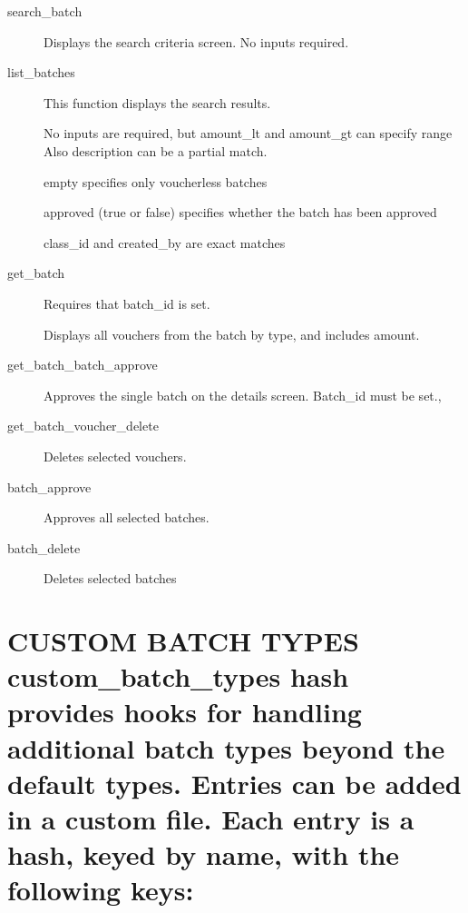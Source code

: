 \begin{description}
\begin{description}
\item[{search\_batch}] \mbox{}

Displays the search criteria screen.  No inputs required.


\item[{list\_batches}] \mbox{}

This function displays the search results.



No inputs are required, but amount\_lt and amount\_gt can specify range
Also description can be a partial match.



empty specifies only voucherless batches



approved (true or false) specifies whether the batch has been approved



class\_id and created\_by are exact matches


\item[{get\_batch}] \mbox{}

Requires that batch\_id is set.



Displays all vouchers from the batch by type, and includes amount.


\item[{get\_batch\_batch\_approve}] \mbox{}

Approves the single batch on the details screen.  Batch\_id must be set.,


\item[{get\_batch\_voucher\_delete}] \mbox{}

Deletes selected vouchers.


\item[{batch\_approve}] \mbox{}

Approves all selected batches.


\item[{batch\_delete}] \mbox{}

Deletes selected batches

\end{description}
\section{CUSTOM BATCH TYPES
 custom\_batch\_types hash provides hooks for handling additional batch types
 beyond the default types.  Entries can be added in a custom file.
 Each entry is a hash, keyed by name, with the following keys:\label{CUSTOM_BATCH_TYPES_custom_batch_types_hash_provides_hooks_for_handling_additional_batch_types_beyond_the_default_types_Entries_can_be_added_in_a_custom_file_Each_entry_is_a_hash_keyed_by_name_with_the_following_keys:}}
\begin{description}


\end{description}
\end{description}
